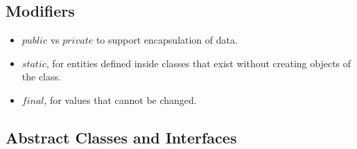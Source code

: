 \documentclass[a4paper]{article}
\begin{document}
\subsection{Modifiers}
\begin{itemize}
    \item $public$ vs $private$ to support encapsulation of data.
    \item $static$, for entities defined inside classes that exist without creating objects of the class.
    \item $final$, for values that cannot be changed.
\end{itemize}

\subsection{Abstract Classes and Interfaces}
\end{document}
